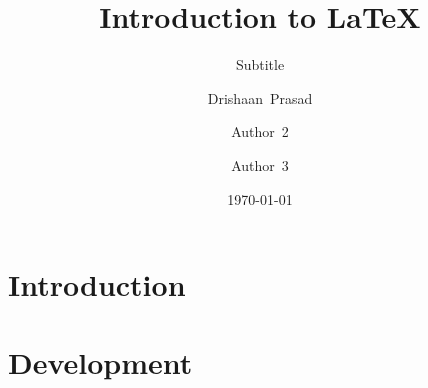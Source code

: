 \documentclass{beamer}
\begin{document}
    \begin{frame}
        \title{Introduction to \LaTeX{}}
        \author{Drishaan~Prasad \and 
        Author~2 \and
        Author~3}
        \date{\today}
        \subtitle{Subtitle}
        \maketitle
    \end{frame}
    \section{Introduction}
    \section{Development}
\end{document}
